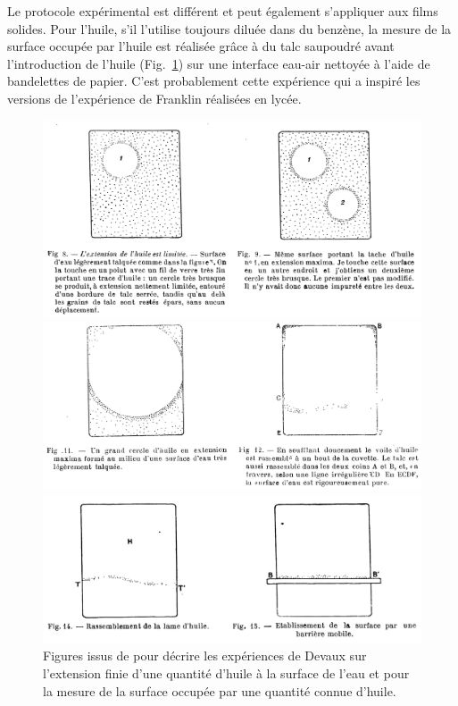 \documentclass[12pt,a4paper]{article}
\begin{document}
Le protocole expérimental est différent \cite{Marcelin1914, Devaux1931} et peut également s'appliquer aux films solides.
Pour l'huile, s'il l'utilise toujours diluée dans du benzène, la mesure de la surface occupée par l'huile est réalisée grâce à du talc saupoudré avant l'introduction de l'huile (Fig.~\ref{fig:devaux1931}) sur une interface eau-air nettoyée à l'aide de bandelettes de papier.
C'est probablement cette expérience qui a inspiré les versions de l'expérience de Franklin réalisées en lycée.
\begin{figure}
\center
\includegraphics[scale=0.5]{devaux1931a.png}

\includegraphics[scale=0.5]{devaux1931b.png}

\includegraphics[scale=0.5]{devaux1931c.png}

\caption{Figures issus de \cite{Devaux1931} pour décrire les expériences de Devaux sur l'extension finie d'une quantité d'huile à la surface de l'eau et pour la mesure de la surface occupée par une quantité connue d'huile.}
\label{fig:devaux1931}
\end{figure}
\end{document}
